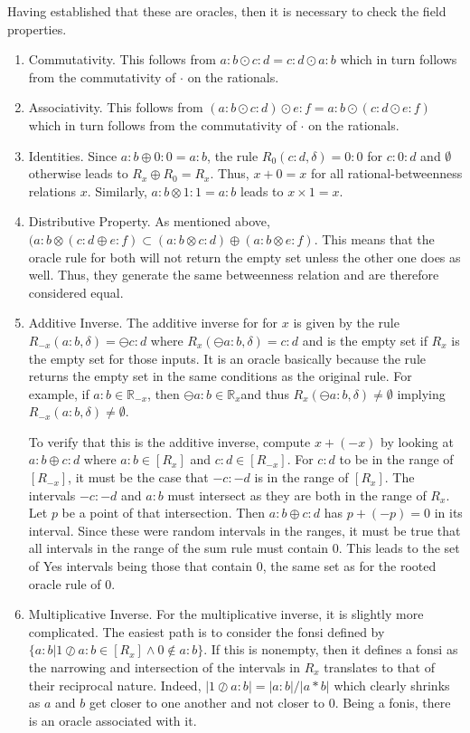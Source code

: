 \documentclass[12pt]{article}
\begin{document}
Having established that these are oracles, then it is necessary to check the field properties. 
\begin{enumerate}
    \item Commutativity. This follows from $a:b \odot c:d = c:d \odot a:b$ which in turn follows from the commutativity of $\cdot$ on the rationals. 
    \item Associativity. This follows from $(a:b \odot c:d) \odot e:f = a:b \odot (c:d \odot e:f)$ which in turn follows from the commutativity of $\cdot$ on the rationals. 
    \item Identities. Since $a:b \oplus 0:0 = a:b$, the rule $R_0 (c:d, \delta) = 0:0$ for $c:0:d$ and $\emptyset$ otherwise leads to $R_x \oplus R_0 = R_x$. Thus, $x + 0 = x$ for all rational-betweenness relations $x$. Similarly, $a:b \otimes 1:1 = a:b$ leads to $x \times 1 = x$. 
    \item Distributive Property. As mentioned above, $( a:b \otimes ( c:d \oplus e:f) \subset (a:b \otimes c:d) \oplus (a:b \otimes e:f)$. This means that the oracle rule for both will not return the empty set unless the other one does as well. Thus, they generate the same betweenness relation and are therefore considered equal. 
    \item Additive Inverse.  The additive inverse for for $x$ is given by the rule $R_{-x}(a:b, \delta) = \ominus c:d$ where $R_x (\ominus a:b, \delta) = c:d$  and is the empty set if $R_x$ is the empty set for those inputs. It is an oracle basically because the rule returns the empty set in the same conditions as the original rule. For example, if $a:b \in \mathbb{R}_{-x}$, then $\ominus a:b \in \mathbb{R}_x$and thus $R_x(\ominus a:b, \delta) \neq \emptyset$ implying $R_{-x} (a:b, \delta) \neq \emptyset$.

    To verify that this is the additive inverse, compute $x + (-x)$ by looking at $a:b \oplus c:d$ where $a:b \in [R_x]$ and $c:d \in [R_{-x}]$. For $c:d$ to be in the range of $[R_{-x}]$, it must be the case that $-c:-d$ is in the range of $[R_x]$. The intervals $-c:-d$ and $a:b$ must intersect as they are both in the range of $R_x$. Let $p$ be a point of that intersection. Then $a:b \oplus c:d$ has $p + (-p) =0$ in its interval. Since these were random intervals in the ranges, it must be true that all intervals in the range of the sum rule must contain 0. This leads to the set of Yes intervals being those that contain 0, the same set as for the rooted oracle rule of 0. 
    
    \item Multiplicative Inverse. For the multiplicative inverse, it is slightly more complicated. The easiest path is to consider the fonsi defined by $\{ a:b | 1 \oslash a:b \in [R_x] \wedge 0 \notin a:b \}$. If this is nonempty, then it defines a fonsi as the narrowing and intersection of the intervals in $R_x$ translates to that of their reciprocal nature. Indeed, $|1 \oslash a:b| = |a:b|/|a*b|$ which clearly shrinks as $a$ and $b$ get closer to one another and not closer to 0. Being a fonis, there is an oracle associated with it. 


\end{enumerate}
\end{document}
